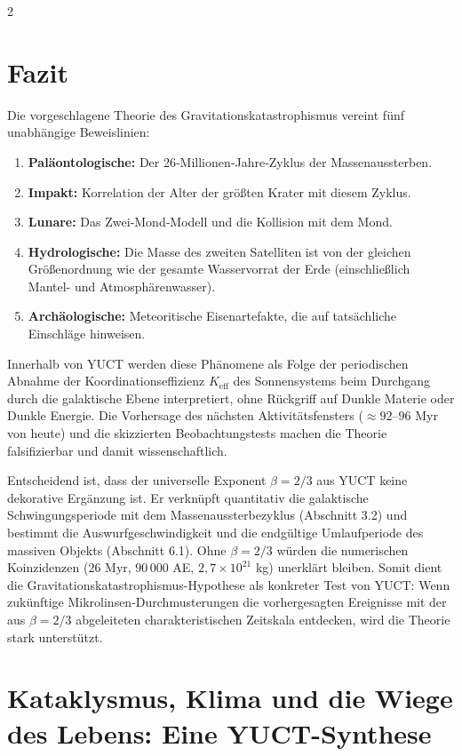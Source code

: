 \documentclass[11pt,a4paper]{article}
\begin{document}
	\begin{multicols}{2}
		
		\section{Fazit}
		
		Die vorgeschlagene Theorie des Gravitationskatastrophismus vereint fünf unabhängige Beweislinien:
		\begin{enumerate}
			\item \textbf{Paläontologische:} Der 26‑Millionen‑Jahre‑Zyklus der Massenaussterben.
			\item \textbf{Impakt:} Korrelation der Alter der größten Krater mit diesem Zyklus.
			\item \textbf{Lunare:} Das Zwei‑Mond‑Modell und die Kollision mit dem Mond.
			\item \textbf{Hydrologische:} Die Masse des zweiten Satelliten ist von der gleichen Größenordnung wie der gesamte Wasservorrat der Erde (einschließlich Mantel- und Atmosphärenwasser).
			\item \textbf{Archäologische:} Meteoritische Eisenartefakte, die auf tatsächliche Einschläge hinweisen.
		\end{enumerate}
		Innerhalb von YUCT werden diese Phänomene als Folge der periodischen Abnahme der Koordinationseffizienz \(K_{\mathrm{eff}}\) des Sonnensystems beim Durchgang durch die galaktische Ebene interpretiert, ohne Rückgriff auf Dunkle Materie oder Dunkle Energie. Die Vorhersage des nächsten Aktivitätsfensters (\(\approx 92\)–\(96\) Myr von heute) und die skizzierten Beobachtungstests machen die Theorie falsifizierbar und damit wissenschaftlich.
		
		Entscheidend ist, dass der universelle Exponent $\beta = 2/3$ aus YUCT keine dekorative Ergänzung ist. Er verknüpft quantitativ die galaktische Schwingungsperiode mit dem Massenaussterbezyklus (Abschnitt 3.2) und bestimmt die Auswurfgeschwindigkeit und die endgültige Umlaufperiode des massiven Objekts (Abschnitt 6.1). Ohne $\beta = 2/3$ würden die numerischen Koinzidenzen ($26$ Myr, $90\,000$ AE, $2,7\times10^{21}$ kg) unerklärt bleiben. Somit dient die Gravitationskatastrophismus-Hypothese als konkreter Test von YUCT: Wenn zukünftige Mikrolinsen-Durchmusterungen die vorhergesagten Ereignisse mit der aus $\beta = 2/3$ abgeleiteten charakteristischen Zeitskala entdecken, wird die Theorie stark unterstützt.
		
		\section{Kataklysmus, Klima und die Wiege des Lebens: Eine YUCT-Synthese}
		

\end{multicols}
\end{document}
